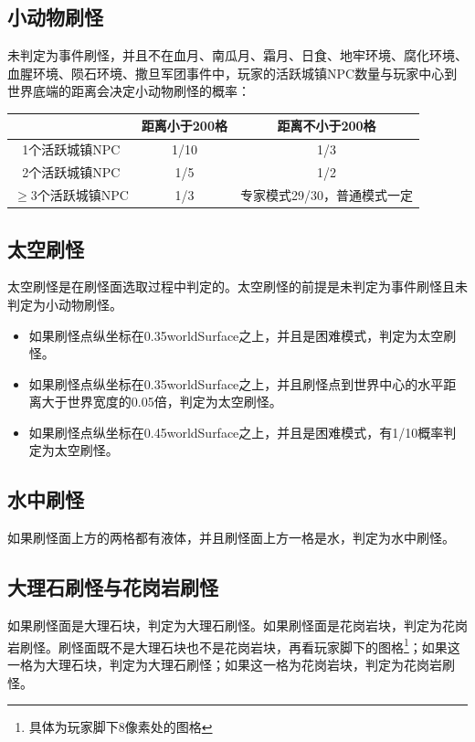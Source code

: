 \subsection{小动物刷怪}
未判定为事件刷怪，并且不在血月、南瓜月、霜月、日食、地牢环境、腐化环境、血腥环境、陨石环境、撒旦军团事件中，玩家的活跃城镇NPC数量与玩家中心到世界底端的距离会决定小动物刷怪的概率：\\
\begin{center}
\begin{tabular}{|c|c|c|}
    \hline
    &距离小于200格&距离不小于200格\\\hline
    1个活跃城镇NPC&1/10&1/3\\\hline
    2个活跃城镇NPC&1/5&1/2\\\hline
    $\ge$3个活跃城镇NPC&1/3&专家模式29/30，普通模式一定\\\hline
\end{tabular}
\end{center}

\subsection{太空刷怪}\label{app22}
太空刷怪是在刷怪面选取过程中判定的。太空刷怪的前提是未判定为事件刷怪且未判定为小动物刷怪。
\begin{itemize}
    \item 如果刷怪点纵坐标在0.35worldSurface之上，并且是困难模式，判定为太空刷怪。
    \item 如果刷怪点纵坐标在0.35worldSurface之上，并且刷怪点到世界中心的水平距离大于世界宽度的0.05倍，判定为太空刷怪。
    \item 如果刷怪点纵坐标在0.45worldSurface之上，并且是困难模式，有1/10概率判定为太空刷怪。
\end{itemize}

\subsection{水中刷怪}
如果刷怪面上方的两格都有液体，并且刷怪面上方一格是水，判定为水中刷怪。

\subsection{大理石刷怪与花岗岩刷怪}
如果刷怪面是大理石块，判定为大理石刷怪。如果刷怪面是花岗岩块，判定为花岗岩刷怪。刷怪面既不是大理石块也不是花岗岩块，再看玩家脚下的图格\footnote{具体为玩家脚下8像素处的图格}；如果这一格为大理石块，判定为大理石刷怪；如果这一格为花岗岩块，判定为花岗岩刷怪。

